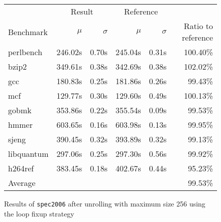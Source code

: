 \begin{figure}[h]
    \begin{center}
        \begin{tabular}{lrrrrr}
            \toprule
            & \multicolumn{2}{c}{Result} & \multicolumn{2}{c}{Reference}\\
            Benchmark & $\mu$ & $\sigma$ & $\mu$ & $\sigma$ & Ratio to reference\\
            \midrule
            perlbench & 246.02s & 0.70s & 245.04s & 0.31s & 100.40\%\\
            bzip2 & 349.61s & 0.38s & 342.69s & 0.38s & 102.02\%\\
            gcc & 180.83s & 0.25s & 181.86s & 0.26s & 99.43\%\\
            mcf & 129.77s & 0.30s & 129.60s & 0.49s & 100.13\%\\
            gobmk & 353.86s & 0.22s & 355.54s & 0.09s & 99.53\%\\
            hmmer & 603.65s & 0.16s & 603.98s & 0.13s & 99.95\%\\
            sjeng & 390.45s & 0.32s & 393.89s & 0.32s & 99.13\%\\
            libquantum & 297.06s & 0.25s & 297.30s & 0.56s & 99.92\%\\
            h264ref & 383.45s & 0.18s & 402.67s & 0.44s & 95.23\%\\
            \midrule
            Average & & & & & 99.53\%\\
            \bottomrule
        \end{tabular}
    \end{center}
    \caption{Results of \texttt{spec2006} after unrolling with maximum size 256 using the loop fixup strategy}
    \label{fig:eval:perf:loop:256}
\end{figure}
